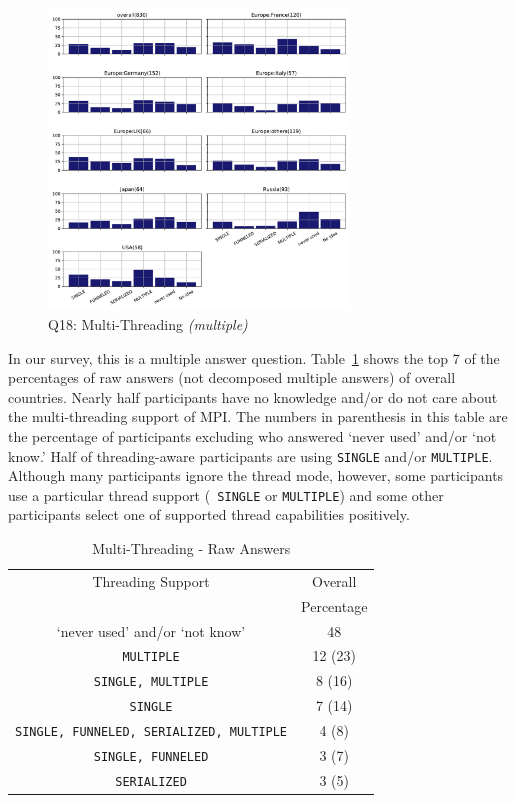 \documentclass[conference,10pt,letterpaper]{IEEEtran}
\def\myquote#1{`#1'}
\begin{document}
\begin{figure}[htb]
\begin{center}
\includegraphics[width=8cm]{Figs/Q18.pdf}
\caption{Q18: Multi-Threading {\it(multiple)}}
\label{fig:multi-thread}
\end{center}
\end{figure}

In our survey, this is a multiple answer
question. Table~\ref{tab:multi-thread-raw} shows the top 7 of the
percentages of raw answers (not decomposed multiple answers) of
overall countries. Nearly half 
participants have no knowledge and/or do not care about the
multi-threading support of 
MPI. The numbers in parenthesis in this table are the percentage of
participants excluding who answered \myquote{never used} and/or
\myquote{not know.} Half of threading-aware participants are using
          {\tt SINGLE}  
and/or {\tt MULTIPLE}. Although many participants ignore the thread
mode, however, some participants use a particular thread support ({\tt
  SINGLE} or {\tt MULTIPLE}) and some other participants select one of
supported thread capabilities positively. 

\begin{table}[htb]%
  \begin{center}%
    \caption{Multi-Threading - Raw Answers}\label{tab:multi-thread-raw}%
    \begin{tabular}{c|c}%
      \hline%
      Threading Support & Overall \\
       & Percentage \\
      \hline%
      \myquote{never used} and/or \myquote{not know} & 48 \\
      {\tt MULTIPLE} & 12 (23) \\
      {\tt SINGLE, MULTIPLE} & 8 (16) \\
      {\tt SINGLE} & 7 (14) \\
      {\tt SINGLE, FUNNELED, SERIALIZED, MULTIPLE} & 4 (8) \\
      {\tt SINGLE, FUNNELED} & 3 (7) \\
      {\tt SERIALIZED} & 3 (5) \\
      \hline%
    \end{tabular}%
  \end{center}%
\end{table}%
\end{document}
